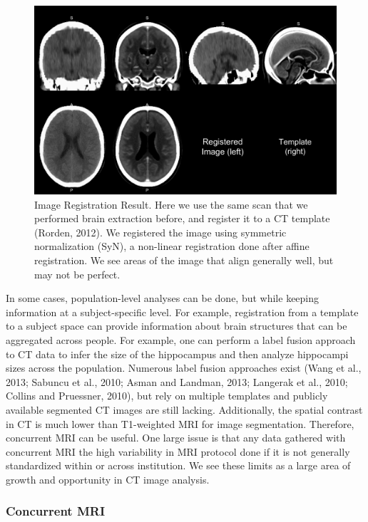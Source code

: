 \documentclass[utf8]{frontiersSCNS}
\begin{document}
\begin{figure}
\includegraphics[width=1\linewidth]{reg_image} \caption{Image Registration Result.  Here we use the same scan that we performed brain extraction before, and register it to a CT template (Rorden, 2012).  We registered the image using symmetric normalization (SyN), a non-linear registration done after affine registration.  We see areas of the image that align generally well, but may not be perfect.}\label{fig:reg}
\end{figure}

In some cases, population-level analyses can be done, but while keeping information at a subject-specific level. For example, registration from a template to a subject space can provide information about brain structures that can be aggregated across people. For example, one can perform a label fusion approach to CT data to infer the size of the hippocampus and then analyze hippocampi sizes across the population. Numerous label fusion approaches exist (Wang et al., 2013; Sabuncu et al., 2010; Asman and Landman, 2013; Langerak et al., 2010; Collins and Pruessner, 2010), but rely on multiple templates and publicly available segmented CT images are still lacking. Additionally, the spatial contrast in CT is much lower than T1-weighted MRI for image segmentation. Therefore, concurrent MRI can be useful. One large issue is that any data gathered with concurrent MRI the high variability in MRI protocol done if it is not generally standardized within or across institution. We see these limits as a large area of growth and opportunity in CT image analysis.

\hypertarget{concurrent-mri}{%
\subsubsection{Concurrent MRI}\label{concurrent-mri}}
\end{document}
